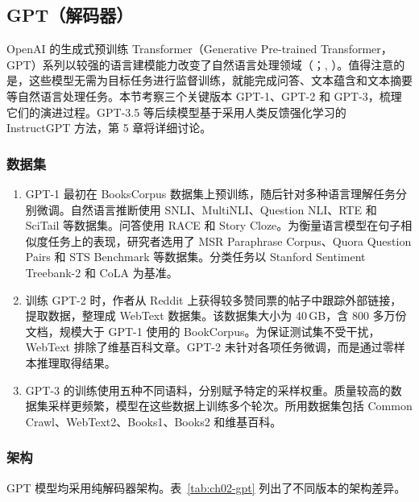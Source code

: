 \subsection{GPT（解码器）}
OpenAI 的生成式预训练 Transformer（Generative Pre-trained Transformer，GPT）系列以较强的语言建模能力改变了自然语言处理领域（；, ）。值得注意的是，这些模型无需为目标任务进行监督训练，就能完成问答、文本蕴含和文本摘要等自然语言处理任务。本节考察三个关键版本 GPT-1、GPT-2 和 GPT-3，梳理它们的演进过程。GPT-3.5 等后续模型基于采用人类反馈强化学习的 InstructGPT 方法，第 5 章将详细讨论。

\subsubsection{数据集}
\begin{enumerate}
\item GPT-1 最初在 BooksCorpus 数据集上预训练，随后针对多种语言理解任务分别微调。自然语言推断使用 SNLI、MultiNLI、Question NLI、RTE 和 SciTail 等数据集。问答使用 RACE 和 Story Cloze。为衡量语言模型在句子相似度任务上的表现，研究者选用了 MSR Paraphrase Corpus、Quora Question Pairs 和 STS Benchmark 等数据集。分类任务以 Stanford Sentiment Treebank-2 和 CoLA 为基准。
\item 训练 GPT-2 时，作者从 Reddit 上获得较多赞同票的帖子中跟踪外部链接，提取数据，整理成 WebText 数据集。该数据集大小为 40\,GB，含 800 多万份文档，规模大于 GPT-1 使用的 BookCorpus。为保证测试集不受干扰，WebText 排除了维基百科文章。GPT-2 未针对各项任务微调，而是通过零样本推理取得结果。
\item GPT-3 的训练使用五种不同语料，分别赋予特定的采样权重。质量较高的数据集采样更频繁，模型在这些数据上训练多个轮次。所用数据集包括 Common Crawl、WebText2、Books1、Books2 和维基百科。
\end{enumerate}

\subsubsection{架构}
GPT 模型均采用纯解码器架构。表~\ref{tab:ch02-gpt} 列出了不同版本的架构差异。


